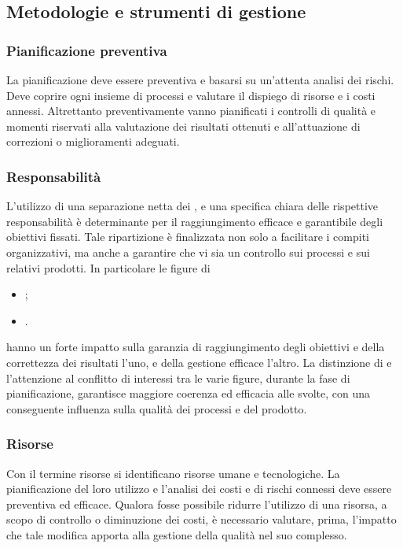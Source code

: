 \documentclass[12pt,a4paper]{article}
\begin{document}
\subsection{Metodologie e strumenti di gestione}

\subsubsection{Pianificazione preventiva}
La pianificazione deve essere preventiva e basarsi su un'attenta analisi dei rischi. Deve coprire ogni insieme di processi e valutare il dispiego di risorse e i costi annessi. Altrettanto preventivamente vanno pianificati i controlli di qualità e momenti riservati alla valutazione dei risultati ottenuti e all'attuazione di correzioni o miglioramenti adeguati.

\subsubsection{Responsabilità}
L'utilizzo di una separazione netta dei , e una specifica chiara delle rispettive responsabilità è determinante per il raggiungimento efficace e garantibile degli obiettivi fissati. Tale ripartizione è finalizzata non solo a facilitare i compiti organizzativi, ma anche a garantire che vi sia un controllo sui processi e sui relativi prodotti. In particolare le figure di
\begin{itemize}
	\item \VR;
	\item \RE.
\end{itemize}
hanno un forte impatto sulla garanzia di raggiungimento degli obiettivi e della correttezza dei risultati l'uno, e della gestione efficace l'altro. La distinzione di  e l'attenzione al conflitto di interessi tra le varie figure, durante la fase di pianificazione, garantisce maggiore coerenza ed efficacia alle   svolte, con una conseguente influenza sulla qualità dei  processi e del prodotto.

\subsubsection{Risorse}\label{risorse}
Con il termine risorse si identificano risorse umane e tecnologiche. La pianificazione del loro utilizzo e l'analisi dei costi e di rischi connessi deve essere preventiva ed efficace. Qualora fosse possibile ridurre l'utilizzo di una risorsa, a scopo di controllo o diminuzione dei costi, è necessario valutare, prima, l'impatto che tale modifica apporta alla gestione della qualità nel suo complesso.
\end{document}

